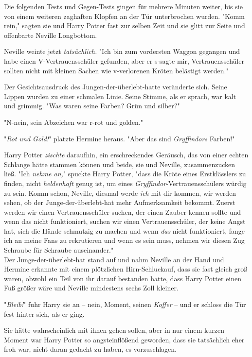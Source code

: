{Die folgenden Tests und Gegen-Tests gingen für mehrere Minuten weiter, bis sie von einem weiteren zaghaften Klopfen an der Tür unterbrochen wurden. "Komm rein," sagten sie und Harry Potter fast zur selben Zeit und sie glitt zur Seite und offenbarte Neville Longbottom.

Neville weinte jetzt \emph{tatsächlich.} "Ich bin zum vordersten Waggon gegangen und habe einen V-Vertrauensschüler gefunden, aber er s-sagte mir, Vertrauensschüler sollten nicht mit kleinen Sachen wie v-verlorenen Kröten belästigt werden."

Der Gesichtsausdruck des Jungen-der-überlebt-hatte veränderte sich. Seine Lippen wurden zu einer schmalen Linie. Seine Stimme, als er sprach, war kalt und grimmig. "Was waren seine Farben? Grün und silber?"

"N-nein, sein Abzeichen war r-rot und golden."

"\emph{Rot und Gold!}" platzte Hermine heraus. "Aber das sind \emph{Gryffindors} Farben!"

Harry Potter \emph{zischte} daraufhin, ein erschreckendes Geräusch, das von einer echten Schlange hätte stammen können und beide, sie und Neville, zusammenzucken ließ. "Ich \emph{nehme an,}" spuckte Harry Potter, "dass die Kröte eines Erstklässlers zu finden, nicht \emph{heldenhaft} genug ist, um eines \emph{Gryffindor}-Vertrauensschülers würdig zu sein. Komm schon, Neville, diesmal werde \emph{ich} mit dir kommen, wir werden sehen, ob der Junge-der-überlebt-hat mehr Aufmerksamkeit bekommt. Zuerst werden wir einen Vertrauensschüler suchen, der einen Zauber kennen sollte und wenn das nicht funktioniert, suchen wir einen Vertrauensschüler, der keine Angst hat, sich die Hände schmutzig zu machen und wenn \emph{das} nicht funktioniert, fange ich an meine Fans zu rekrutieren und wenn es sein muss, nehmen wir diesen Zug Schraube für Schraube auseinander."\\ Der Junge-der-überlebt-hat stand auf und nahm Neville an der Hand und Hermine erkannte mit einem plötzlichen Hirn-Schluckauf, dass sie fast gleich groß waren, obwohl ein Teil von ihr darauf bestanden hatte, dass Harry Potter einen Fuß größer wäre und Neville mindestens sechs Zoll kleiner.

"\emph{Bleib!}" fuhr Harry sie an -- nein, Moment, seinen \emph{Koffer} -- und er schloss die Tür fest hinter sich, als er ging.

Sie hätte wahrscheinlich mit ihnen gehen sollen, aber in nur einem kurzen Moment war Harry Potter so angsteinflößend geworden, dass sie tatsächlich eher froh war, nicht daran gedacht zu haben, es vorzuschlagen.

}

